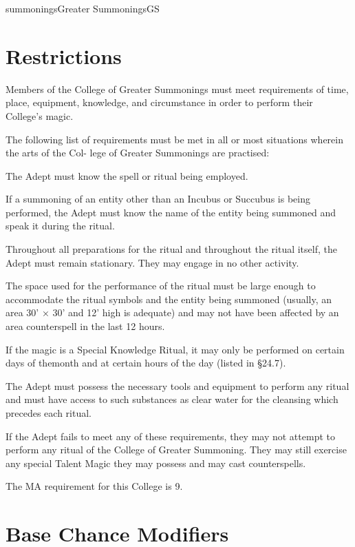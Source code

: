 \begin{College}[1.0]{summonings}{Greater Summonings}{GS}
\section{Restrictions}

Members of the College of Greater Summonings must meet requirements of
time, place, equipment, knowledge, and circumstance in order to
perform their College’s magic.

The following list of requirements must be met in all or most
situations wherein the arts of the Col- lege of Greater Summonings are
practised:
\begin{Enumerate}
\item  The Adept must know the spell or ritual being employed.

\item If a summoning of an entity other than an Incubus or Succubus is
being performed, the Adept must know the name of the entity being
summoned and speak it during the ritual.

\item  Throughout all preparations for the ritual and throughout the
ritual itself, the Adept must remain stationary. They may engage in no
other activity.

\item The space used for the performance of the ritual must be large
enough to accommodate the ritual symbols and the entity being summoned
(usually, an area 30’ × 30’ and 12’ high is adequate) and may not have
been affected by an area counterspell in the last 12 hours.

\item If the magic is a Special Knowledge Ritual, it may only be
  performed on certain days of themonth and at certain hours of the
  day (listed in §24.7).


\item The Adept must possess the necessary tools and equipment to
  perform any ritual and must have access to such substances as clear
  water for the cleansing which precedes each ritual.
\end{Enumerate}

If the Adept fails to meet any of these requirements, they may not
attempt to perform any ritual of the College of Greater Summoning.
They may still exercise any special Talent Magic they may possess and
may cast counterspells.

The MA requirement for this College is 9. 

\section{Base Chance Modifiers}


\end{College}
